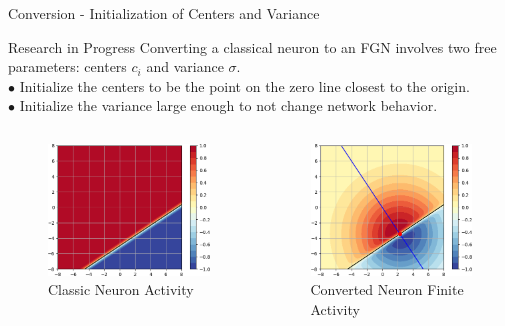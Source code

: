 \documentclass{beamer}
\begin{document}
\begin{frame}{Conversion - Initialization of Centers and Variance}
    \begin{block}{Research in Progress}
    Converting a classical neuron to an FGN involves two free parameters: centers $c_i$ and variance $\sigma$.\\
    $\bullet$ Initialize the centers to be the point on the zero line closest to the origin.\\
    $\bullet$ Initialize the variance large enough to not change network behavior.
    \end{block}
    
    \begin{columns}
    \begin{column}{.5\textwidth}
    \begin{figure}
        \includegraphics[width=.8\textwidth]{images/2D-Conversion/classic-act.png}
        \caption*{Classic Neuron Activity}
    \end{figure}
    \end{column}
    \begin{column}{.5\textwidth}
    \begin{figure}
        \includegraphics[width=.8\textwidth]{images/2D-Conversion/converted-act.png}
        \caption*{Converted Neuron Finite Activity}
    \end{figure}
    \end{column}
    \end{columns}
    
\end{frame}
\end{document}
